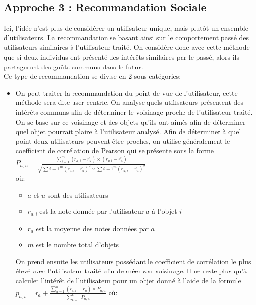 \documentclass[light]{ceri}
\begin{document}
\subsection{Approche 3 : Recommandation Sociale\cite{social}}   
Ici, l'idée n'est plus de considérer un utilisateur unique, mais plutôt un ensemble d'utilisateurs. La recommandation se basant ainsi sur le comportement passé des utilisateurs similaires à l'utilisateur traité. On considère donc avec cette méthode que si deux individus ont présenté des intérêts similaires par le passé, alors ils partageront des goûts communs dans le futur.\\
 Ce type de recommandation se divise en 2 sous catégories:
    \begin{itemize}
        \item On peut traiter la recommandation du point de vue de l'utilisateur, cette méthode sera dite user-centric. On analyse quels utilisateurs présentent des intérêts communs afin de déterminer le voisinage proche de l'utilisateur traité. On se base sur ce voisinage et des objets qu'ils ont aimés afin de déterminer quel objet pourrait plaire à l'utilisateur analysé. Afin de déterminer à quel point deux utilisateurs peuvent être proches, on utilise généralement le coefficient de corrélation de Pearson qui se présente sous la forme \\
        {\Large $P_{a,u}=\frac{\sum_{i=1}^m (r_{a,i}-\bar{r_{a}}) \times (r_{u,i}-\bar{r_{u}}) }{\sqrt{\sum{i=1}^m (r_{a,i}-\bar{r_{a}})^2 \times \sum{i=1}^m (r_{u,i}-\bar{r_{u}})^2 }}$}  \\ 
        où:
            \begin{itemize}
                \item $a$ et $u$ sont des utilisateurs
                \item $r_{a,i}$ est la note donnée par l'utilisateur $a$ à l'objet $i$
                \item $\bar{r_{a}}$ est la moyenne des notes données par $a$
                \item $m$ est le nombre total d'objets
            \end{itemize}
        On prend ensuite les utilisateurs possédant le coefficient de corrélation le plus élevé avec l'utilisateur traité afin de créer son voisinage. Il ne reste plus qu'à calculer l'intérêt de l'utilisateur pour un objet donné à l'aide de la formule {\large$p_{a,i}=\bar{r_{a}}+\frac{\sum_{u=1}^n (r_{u,i}-\bar{r_{u}}) \times P_{a,u}}{\sum_{u=1}^n P_{a,u}}$} où:
            \begin{itemize}

\end{itemize}
\end{itemize}
\end{document}
